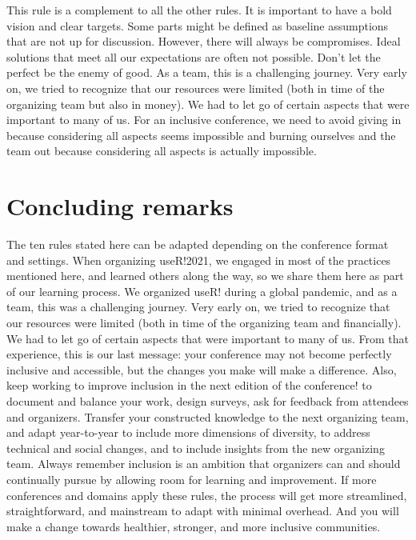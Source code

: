 \documentclass[10pt,letterpaper]{article}
\begin{document}
This rule is a complement to all the other rules. It is important to have a bold vision and clear targets. Some parts might be defined as baseline assumptions that are not up for discussion. However, there will always be compromises. Ideal solutions that meet all our expectations are often not possible. Don't let the perfect be the enemy of good. As a team, this is a challenging journey. Very early on, we tried to recognize that our resources were limited (both in time of the organizing team but also in money). We had to let go of certain aspects that were important to many of us. For an inclusive conference, we need to avoid giving in because considering all aspects seems impossible and burning ourselves and the team out because considering all aspects is actually impossible.


\section*{Concluding remarks}

The ten rules stated here can be adapted depending on the conference format and settings.
When organizing useR!2021, we engaged in most of the practices mentioned here, and learned others along the way, so we share them here as part of our learning process. 
We organized useR! during a global pandemic, and as a team, this was a challenging journey. 
Very early on, we tried to recognize that our resources were limited (both in time of the organizing team and financially). 
We had to let go of certain aspects that were important to many of us. 
From that experience, this is our last message: your conference may not become perfectly inclusive and accessible, but the changes you make will make a difference.
Also, keep working to improve inclusion in the next edition of the conference! to document and balance your work, design surveys, ask for feedback from attendees and organizers. Transfer your constructed knowledge to the next organizing team, and adapt year-to-year to include more dimensions of diversity, to address technical and social changes, and to include insights from the new organizing team. Always remember inclusion is an ambition that organizers can and should continually pursue by allowing room for learning and improvement.
If more conferences and domains apply these rules, the process will get more streamlined, straightforward, and mainstream to adapt with minimal overhead.
And you will make a change towards healthier, stronger, and more inclusive communities.


\end{document}
